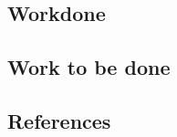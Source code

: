 \documentclass[a4paper,12pt]{article}
\begin{document}
\subsection{Workdone}
\pagebreak
\subsection{Work to be done }
\pagebreak
\begin{center}
   \section*{References}
\cite{thapa2020detecting} 
\end{center}
\end{document}
